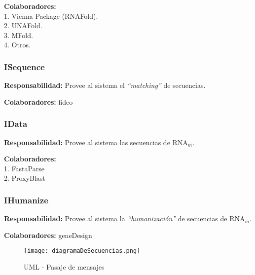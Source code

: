 \par \textbf{Colaboradores:} \\
\hspace*{3.75cm} 1. Vienna Package (RNAFold). \\
\hspace*{3.75cm} 2. UNAFold. \\
\hspace*{3.75cm} 3. MFold. \\
\hspace*{3.75cm} 4. Otros.

\subsubsection{ISequence}
\par \textbf{Responsabilidad:} Provee al sistema el \emph{``matching''} de secuencias.
	
\par \textbf{Colaboradores:} fideo 

\subsubsection{IData}
\par \textbf{Responsabilidad:} Provee al sistema las secuencias de RNA$_m$.

\par \textbf{Colaboradores:} \\
\hspace*{3.75cm} 1. FastaParse \\
\hspace*{3.75cm} 2. ProxyBlast \\

\subsubsection{IHumanize}
\par \textbf{Responsabilidad:} Provee al sistema la \emph{``humanización''} de secuencias de RNA$_m$.
	
\par \textbf{Colaboradores:} geneDesign 

\begin{figure}
  \centering
  \texttt{[image: diagramaDeSecuencias.png]}  
  \caption{UML - Pasaje de mensajes}
  \label{mensajes}
\end{figure}
